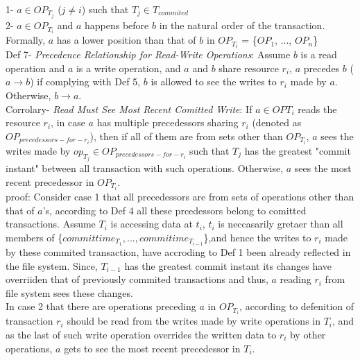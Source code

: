 \documentclass[a4paper, 11pt]{article}
\begin{document}
\hspace{7mm} 1- $a \in OP_{T_j}$ ($j \neq i$)  such that $T_j \in T_{commited}$ \\

\hspace{7mm} 2- $a \in OP_{T_i}$ and $a$ happens before $b$ in the natural order of the transaction. Formally, $a$ has a lower position than that of $b$ in $OP_{T_i}$ = \{$OP_1$, ..., $OP_n$\} \\


Def 7- \emph{Precedence Relationship for Read-Write Operations}: Assume $b$ is a read operation and $a$ is a write operation, and $a$ and $b$ share resource $r_i$, $a$ precedes $b$ ($a \rightarrow b$) if complying with Def 5, $b$ is allowed to see the writes to $r_i$ made by $a$. Otherwise, $b \rightarrow a$. \\


Corrolary- \emph{Read Must See Most Recent Comitted Write}: If $a \in OP{T_i}$ reads the resource $r_i$, in case $a$ has multiple precedessors sharing $r_i$ (denoted as $OP_{precedessors-for-r_i}$), then if all of them are from sets other than $OP_{T_i}$, $a$ sees the writes made by $op_{T_j} \in OP_{precedessors-for-r_i}$ such that $T_j$ has the greatest "commit instant" between all transaction with such operations. Otherwise, $a$ sees the most recent precedessor in $OP_{T_i}$. \\

proof: Consider case 1 that all precedessors are from sets of operations other than that of $a$'s, according to Def 4 all these prcedessors belong to comitted transactions. Assume $T_i$ is accessing data at $t_i$, $t_i$ is neccasarily gretaer than all members of \{$committime_{T_1}, ..., commitime_{T_{i-1}}$\},and hence the writes to $r_i$ made by these commited transaction, have accroding to Def 1 been already reflected in the file system. Since, $T_{i-1}$ has the greatest commit instant its changes have overriiden that of previously commited transactions and thus, $a$ reading $r_i$ from file system sees these changes.\\

In case 2 that there are operations preceding $a$ in $OP_{T_i}$, according to defenition of transaction $r_i$ should be read from the writes made by write operations in $T_i$, and as the last of such write operation overrides the written data to $r_i$ by other operations, $a$ gets to see the most recent precedessor in $T_i$.\\   
\end{document}
